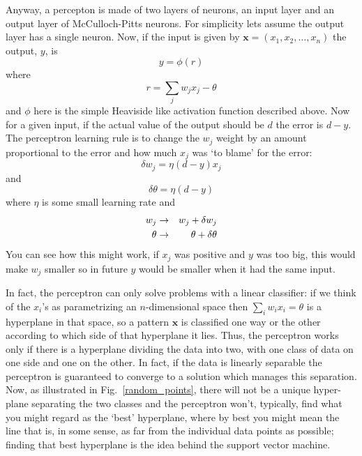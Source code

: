 \documentclass[12pt]{article}
\begin{document}
Anyway, a percepton is made of two layers of neurons, an input layer
and an output layer of McCulloch-Pitts neurons. For simplicity lets
assume the output layer
has a single neuron. Now, if the input is given by
$\textbf{x}=(x_1,x_2,\ldots,x_n)$ the output, $y$, is
\begin{equation}
y=\phi(r)
\end{equation}
where
\begin{equation}
r=\sum_j w_j x_j-\theta
\end{equation}
and $\phi$ here is the simple Heaviside like activation function
described above. Now for a given input, if the actual value of the
output should be $d$ the error is $d-y$. The perceptron learning rule
is to change the $w_j$ weight by an amount proportional to the error
and how much $x_j$ was \lq{}to blame\rq{} for the error:
\begin{equation}
\delta w_j=\eta (d-y) x_j
\end{equation}
and
\begin{equation}
\delta \theta =  \eta (d-y)
\end{equation}
where $\eta$ is some small learning rate and
\begin{eqnarray}
w_j&\rightarrow& w_j+\delta w_j\cr
\theta&\rightarrow& \theta+\delta\theta
\end{eqnarray}
You can see how this might work, if $x_j$ was positive and $y$ was too
big, this would make $w_j$ smaller so in future $y$ would be smaller
when it had the same input. 

In fact, the perceptron can only solve problems with a linear
classifier: if we think of the $x_i$'s as parametrizing an
$n$-dimensional space then $\sum_iw_ix_i=\theta$ is a hyperplane in
that space, so a pattern $\textbf{x}$ is classified one way or the
other according to which side of that hyperplane it lies. Thus, the
perceptron works only if there is a hyperplane dividing the data into
two, with one class of data on one side and one on the other. In fact,
if the data is linearly separable the perceptron is guaranteed to
converge to a solution which manages this separation. Now, as
illustrated in Fig.~\ref{random_points}, there will not be a unique
hyper-plane separating the two classes and the perceptron won't,
typically, find what you might regard as the \lq{}best\rq{}
hyperplane, where by best you might mean the line that is, in some
sense, as far from the individual data points as possible; finding
that best hyperplane is the idea behind the support vector machine.
\end{document}
